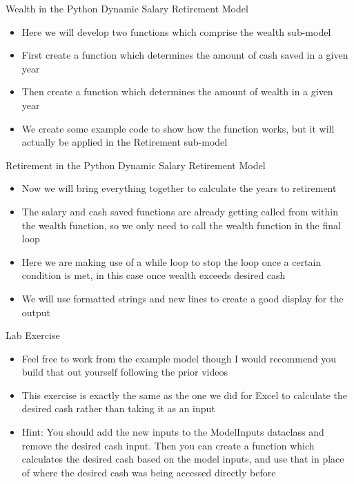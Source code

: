 \documentclass[]{article}
\begin{document}
\begin{section}{Wealth in the Python Dynamic Salary Retirement Model}
\begin{itemize}
\item Here we will develop two functions which comprise the wealth sub-model
\item First create a function which determines the amount of cash saved in a given year
\item Then create a function which determines the amount of wealth in a given year
\item We create some example code to show how the function works, but it will actually be applied in the Retirement sub-model
\end{itemize}
\end{section}
\begin{section}{Retirement in the Python Dynamic Salary Retirement Model}
\begin{itemize}
\item Now we will bring everything together to calculate the years to retirement
\item The salary and cash saved functions are already getting called from within the wealth function, so we only need to call the wealth function in the final loop
\item Here we are making use of a while loop to stop the loop once a certain condition is met, in this case once wealth exceeds desired cash
\item We will use formatted strings and new lines to create a good display for the output
\end{itemize}
\end{section}
\begin{section}{Lab Exercise}
\begin{itemize}
\item Feel free to work from the example model though I would recommend you build that out yourself following the prior videos
\item This exercise is exactly the same as the one we did for Excel to calculate the desired cash rather than taking it as an input
\item Hint: You should add the new inputs to the ModelInputs dataclass and remove the desired cash input. Then you can create a function which calculates the desired cash based on the model inputs, and use that in place of where the desired cash was being accessed directly before
\end{itemize}
\end{section}
\end{document}
